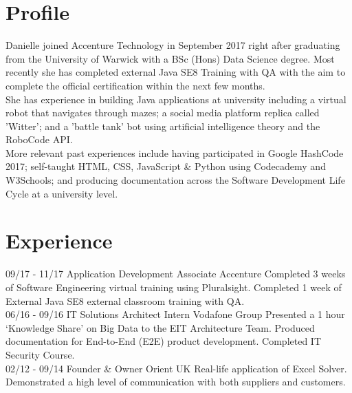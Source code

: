 \documentclass[]{friggeri-cv}
\begin{document}
\section{Profile}
      Danielle joined Accenture Technology in September 2017 right after graduating from the University of Warwick with a BSc (Hons) Data Science degree. Most recently she has completed external Java SE8 Training with QA with the aim to complete the official certification within the next few months.\\
      
      She has experience in building Java applications at university including a virtual robot that navigates through mazes; a social media platform replica called 'Witter'; and a 'battle tank' bot using artificial intelligence theory and the RoboCode API.\\
      
      More relevant past experiences include having participated in Google HashCode 2017; self-taught HTML, CSS, JavaScript \& Python using Codecademy and W3Schools; and producing documentation across the Software Development Life Cycle at a university level.\\

\section{Experience}
\begin{entrylist}
    \entry
    {09/17 - 11/17}
    {Application Development Associate}
    {Accenture}
    {Completed 3 weeks of Software Engineering virtual training using Pluralsight. Completed 1 week of External Java SE8 external classroom training with QA.\\}
    \entry
    {06/16 - 09/16}
    {IT Solutions Architect Intern}
    {Vodafone Group}
    {Presented a 1 hour ‘Knowledge Share’ on Big Data to the EIT Architecture Team. Produced documentation for End-to-End (E2E) product development. Completed IT Security Course.\\}
    \entry
    {02/12 - 09/14}
    {Founder \& Owner}
    {Orient UK}
    {Real-life application of Excel Solver. Demonstrated a high level of communication with both suppliers and customers.\\}
\end{entrylist}
\end{document}
